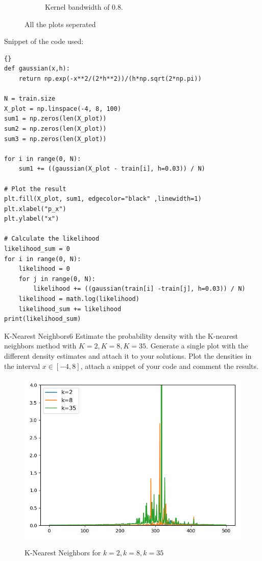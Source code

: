 \begin{questions}
\begin{figure}[H]
\begin{subfigure}[b]{0.3\linewidth}
	\caption{Kernel bandwidth of 0.8.}
	\label{fig:kd03}
\end{subfigure}
	\caption{All the plots seperated}
\end{figure}


Snippet of the code used: 
\begin{lstlisting}{}
def gaussian(x,h):
    return np.exp(-x**2/(2*h**2))/(h*np.sqrt(2*np.pi))  

N = train.size
X_plot = np.linspace(-4, 8, 100)
sum1 = np.zeros(len(X_plot))
sum2 = np.zeros(len(X_plot))
sum3 = np.zeros(len(X_plot))

for i in range(0, N):
    sum1 += ((gaussian(X_plot - train[i], h=0.03)) / N)

# Plot the result
plt.fill(X_plot, sum1, edgecolor="black" ,linewidth=1)
plt.xlabel("p_x")
plt.ylabel("x")

# Calculate the likelihood
likelihood_sum = 0
for i in range(0, N):
    likelihood = 0
    for j in range(0, N):
        likelihood += ((gaussian(train[i] -train[j], h=0.03)) / N)
    likelihood = math.log(likelihood)
    likelihood_sum += likelihood
print(likelihood_sum)
\end{lstlisting}


\begin{question}{K-Nearest Neighbors}{6}
Estimate the probability density with the K-nearest neighbors method with $K=2, K=8, K=35$.
Generate a single plot with the different density estimates and attach it to your solutions. Plot the densities in the interval $x \in [-4,8]$, attach a snippet of your code and comment the results.

\begin{answer}


\end{answer}

\end{question}


\begin{figure}[!h]
	\includegraphics[width=0.62\linewidth]{pictures/knnplot.png}
	\centering
	\label{kd}
	\caption{K-Nearest Neighbors for $k=2, k=8, k=35$}
\end{figure}


\end{questions}
